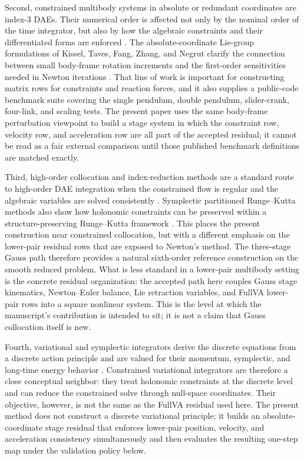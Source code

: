 \documentclass[preprint,12pt]{elsarticle}
\begin{document}
Second, constrained multibody systems in absolute or redundant coordinates are
index-3 DAEs. Their numerical order is affected not only by the nominal order
of the time integrator, but also by how the algebraic constraints and their
differentiated forms are enforced \cite{hairer1993solving}. The
absolute-coordinate Lie-group formulations of Kissel, Taves, Fang, Zhang, and
Negrut clarify the connection between small body-frame rotation increments and
the first-order sensitivities needed in Newton iterations
\cite{taves2020exponential,kissel2021dwelling,kissel2022absolute,fang2023halfimplicit,kissel2024velocitypartitioning}.
That line of work is important for constructing matrix rows for constraints
and reaction forces, and it also supplies a public-code benchmark suite
covering the single pendulum, double pendulum, slider-crank, four-link, and
scaling tests. The present paper uses the same body-frame perturbation
viewpoint to build a stage system in which the constraint row, velocity row,
and acceleration row are all part of the accepted residual; it cannot be read
as a fair external comparison until those published benchmark definitions are
matched exactly.

Third, high-order collocation and index-reduction methods are a standard route
to high-order DAE integration when the constrained flow is regular and the
algebraic variables are solved consistently
\cite{gear1985automatic,hairer1993solving}. Symplectic partitioned
Runge--Kutta methods also show how holonomic constraints can be preserved
within a structure-preserving Runge--Kutta framework \cite{jay1996symplectic}.
This places the present construction near constrained collocation, but with a
different emphasis on the lower-pair residual rows that are exposed to Newton's
method.
The three-stage Gauss path therefore provides a natural sixth-order reference
construction on the smooth reduced problem. What is less standard in a
lower-pair multibody setting is the concrete residual organization: the
accepted path here couples Gauss stage kinematics, Newton--Euler balance, Lie
retraction variables, and FullVA lower-pair rows into a square nonlinear
system. This is the level at which the manuscript's contribution is intended
to sit; it is not a claim that Gauss collocation itself is new.

Fourth, variational and symplectic integrators derive the discrete equations
from a discrete action principle and are valued for their momentum,
symplectic, and long-time energy behavior
\cite{marsden2001discrete,leyendecker2008variational,leok2012prolongation}.
Constrained variational integrators are therefore a close conceptual
neighbor: they treat holonomic constraints at the discrete level and can
reduce the constrained solve through null-space coordinates. Their objective,
however, is not the same as the FullVA residual used here. The present method
does not construct a discrete variational principle; it builds an
absolute-coordinate stage residual that enforces lower-pair position,
velocity, and acceleration consistency simultaneously and then evaluates the
resulting one-step map under the validation policy below.
\end{document}
